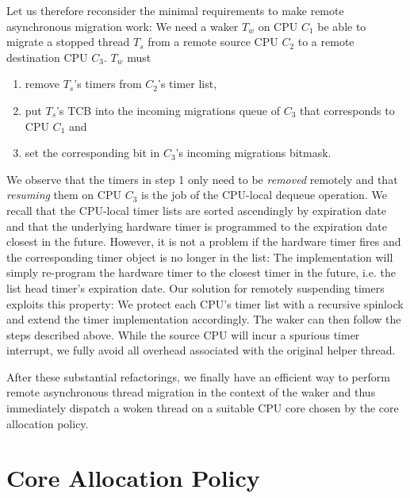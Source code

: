 \documentclass[12pt,a4paper]{book}
\begin{document}
Let us therefore reconsider the minimal requirements to make remote asynchronous migration work:
We need a waker $T_w$ on CPU $C_1$ be able to migrate a stopped thread $T_s$ from a remote source CPU $C_2$ to a remote destination CPU $C_3$. $T_w$ must
\begin{enumerate}
    \item remove $T_s$'s timers from $C_2$'s timer list,
    \item put $T_s$'s TCB into the incoming migrations queue of $C_3$ that corresponds to CPU $C_1$ and 
    \item set the corresponding bit in $C_3$'s incoming migrations bitmask.
\end{enumerate}
We observe that the timers in step 1 only need to be \emph{removed} remotely and that \emph{resuming} them on CPU $C_3$ is the job of the CPU-local dequeue operation.
We recall that the CPU-local timer lists are sorted ascendingly by expiration date and that the underlying hardware timer is programmed to the expiration date closest in the future.
However, it is not a problem if the hardware timer fires and the corresponding timer object is no longer in the list:
The implementation will simply re-program the hardware timer to the closest timer in the future, i.e. the list head timer's expiration date.
Our solution for remotely suspending timers exploits this property:
We protect each CPU's timer list with a recursive spinlock and extend the timer implementation accordingly.
The waker can then follow the steps described above.
While the source CPU will incur a spurious timer interrupt, we fully avoid all overhead associated with the original helper thread.

After these substantial refactorings, we finally have an efficient way to perform remote asynchronous thread migration in the context of the waker and thus immediately dispatch a woken thread on a suitable CPU core chosen by the core allocation policy.

\section{Core Allocation Policy}\label{ch:di:pol}
%   
%
\end{document}
